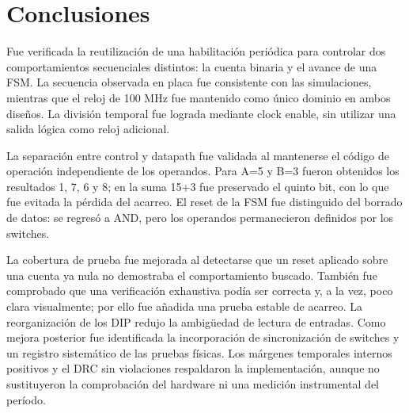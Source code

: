 \section{Conclusiones}
Fue verificada la reutilización de una habilitación periódica para controlar dos comportamientos secuenciales distintos: la cuenta binaria y el avance de una FSM. La secuencia observada en placa fue consistente con las simulaciones, mientras que el reloj de 100 MHz fue mantenido como único dominio en ambos diseños. La división temporal fue lograda mediante clock enable, sin utilizar una salida lógica como reloj adicional.

La separación entre control y datapath fue validada al mantenerse el código de operación independiente de los operandos. Para A=5 y B=3 fueron obtenidos los resultados 1, 7, 6 y 8; en la suma 15+3 fue preservado el quinto bit, con lo que fue evitada la pérdida del acarreo. El reset de la FSM fue distinguido del borrado de datos: se regresó a AND, pero los operandos permanecieron definidos por los switches.

La cobertura de prueba fue mejorada al detectarse que un reset aplicado sobre una cuenta ya nula no demostraba el comportamiento buscado. También fue comprobado que una verificación exhaustiva podía ser correcta y, a la vez, poco clara visualmente; por ello fue añadida una prueba estable de acarreo. La reorganización de los DIP redujo la ambigüedad de lectura de entradas. Como mejora posterior fue identificada la incorporación de sincronización de switches y un registro sistemático de las pruebas físicas. Los márgenes temporales internos positivos y el DRC sin violaciones respaldaron la implementación, aunque no sustituyeron la comprobación del hardware ni una medición instrumental del período.
